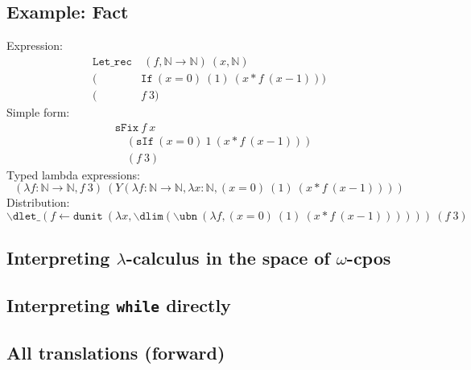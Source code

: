 \documentclass[11pt, leqno, titlepage]{article}
\theoremstyle{definition}
\begin{document}
\subsection{Example: Fact}
Expression:
\begin{align*}
\mathtt{Let\_rec}&~(f,\mathbb{N} \rightarrow \mathbb{N})~(x,\mathbb{N})~\\
  (&\mathtt{If}~(x = 0)~(1)~(x * f~(x-1)))\\
  (&f~3)
\end{align*}
Simple form:
\begin{align*}
  & \mathtt{sFix}~f~x \\
  & \quad (\mathtt{sIf}~(x = 0)~1~(x * f~(x - 1)))\\
  & \quad (f~3)
\end{align*}
Typed lambda expressions:
\[(\lambda f : \mathbb{N} \rightarrow \mathbb{N}, f~3)~(Y (\lambda f : \mathbb{N} \rightarrow \mathbb{N}, \lambda x : \mathbb{N}, (x = 0)~(1)~(x * f~(x-1))))\]
Distribution:
\[\backslash\mathtt{dlet}\_(f \leftarrow \mathtt{dunit}~(\lambda x, \backslash\mathtt{dlim} (\backslash\mathtt{ubn}~(\lambda f, (x = 0)~(1)~(x * f~(x-1))))))~(f~3)\]


\subsection{Interpreting $\lambda$-calculus in the space of $\omega$-cpos}


\subsection{Interpreting \texttt{while} directly}


\subsection{All translations (forward)}
\begin{center}
\end{center}
\end{document}
